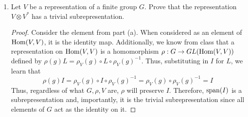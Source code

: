 \documentclass[../psets.tex]{subfiles}
\begin{document}
\begin{enumerate}
\begin{enumerate}
\begin{proof}
            Thus, the restriction $P_2$ of $P$ to $\ker(P)$ is equal to the zero map on $\ker(P)$.\par
            Since $V=\im(P)\oplus\ker(P)$, $P=P_1\oplus P_2$. In particular, there will exist an orthonormal basis in which the first $k$ vectors form a basis of $\im(P)$ and the next $n-k$ vectors form a basis of $\ker(P)$. Thus, $\dim(\im(P))=k$. Moreover, with respect to this basis, the $n\times n$ matrix of $P$ will have a $k\times k$ block in the upper left-hand corner in which $I_k$ resides, and it will be zeroes everywhere else. Since the trace is invariant under similarity transformations, it can be read off from this matrix as $k$ as well.
        \end{proof}
        \item Let $V$ be a representation of a finite group $G$. Prove that the representation $V\otimes V^*$ has a trivial subrepresentation.
        \begin{proof}
            Consider the element from part (a). When considered as an element of $\operatorname{Hom}(V,V)$, it is the identity map. Additionally, we know from class that a representation on $\operatorname{Hom}(V,V)$ is a homomorphism $\rho:G\to GL(\operatorname{Hom}(V,V))$ defined by $\rho(g)L=\rho_V(g)\circ L\circ\rho_V(g)^{-1}$. Thus, substituting in $I$ for $L$, we learn that
            \begin{equation*}
                \rho(g)I = \rho_V(g)\circ I\circ\rho_V(g)^{-1}
                = \rho_V(g)\circ\rho_V(g)^{-1}
                = I
            \end{equation*}
            Thus, regardless of what $G,\rho,V$ are, $\rho$ will preserve $I$. Therefore, $\operatorname{span}(I)$ is a subrepresentation and, importantly, it is the trivial subrepresentation since all elements of $G$ act as the identity on it.
        \end{proof}
    \end{enumerate}
\end{enumerate}
\end{document}

